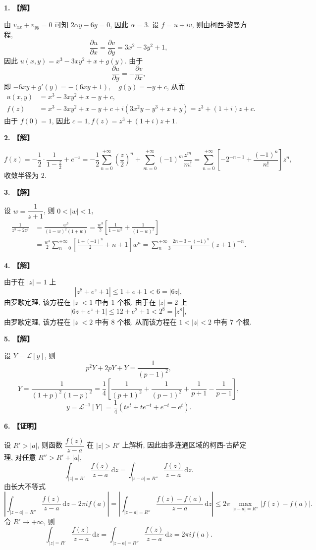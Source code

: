 \documentclass[simple]{hfutexam}
\newcommand{\diff}{\,\mathrm{d}}
\newcommand\msl{\mathscr{L}}
\begin{document}

\textbf{1. 【解】}

由 $v_{xx}+v_{yy}=0$ 可知 $2\alpha y-6y=0$, 因此 $\alpha=3$.
设 $f=u+iv$, 则由柯西-黎曼方程,
  \[\frac{\partial u}{\partial x}=\frac{\partial v}{\partial y}=3x^2-3y^2+1,\]
因此 $u(x,y)=x^3-3xy^2+x+g(y)$.
由于
  \[\frac{\partial u}{\partial y}=-\frac{\partial v}{\partial x},\]
即 $-6xy+g'(y)=-(6xy+1),\quad g(y)=-y+c$, 从而
\begin{align*}
u(x,y)&=x^3-3xy^2+x-y+c,\\
f(z)&=x^3-3xy^2+x-y+c+i(3x^2y-y^3+x+y)
  =z^3+(1+i)z+c.
\end{align*}
由于 $f(0)=1$, 因此 $c=1,f(z)=z^3+(1+i)z+1$.

\textbf{2. 【解】}

\[f(z)=-\frac{1}{2}\cdot\frac{1}{1-\frac z2}+e^{-z}
=-\frac{1}{2}\sum_{n=0}^{+\infty} \left(\frac{z}{2}\right)^n+\sum_{m=0}^{+\infty} (-1)^m\frac{z^m}{m!}
=\sum_{n=0}^{+\infty} \left[-2^{-n-1}+\frac{(-1)^n}{n!}\right]z^n,\]
收敛半径为 $2$.

\textbf{3. 【解】}

设 $w=\dfrac1{z+1}$, 则 $0<|w|<1$,
\begin{align*}
\frac{1}{z^3+2z^2}&=\frac{w^3}{(1-w)^2(1+w)}=\frac{w^3}{2}\left[\frac{1}{1-w^2}+\frac{1}{(1-w)^2}\right]\\
&=\frac{w^3}{2}\sum_{n=0}^{+\infty}\left[\frac{1+(-1)^n}{2}+n+1\right]w^n
=\sum_{n=3}^{+\infty}\frac{2n-3-(-1)^n}{4}(z+1)^{-n}.
\end{align*}

\textbf{4. 【解】}

由于在 $|z|=1$ 上
\[|z^8+e^z+1|\le 1+e+1<6=|6z|,\]
由罗歇定理, 该方程在 $|z|<1$ 中有 $1$ 个根. 由于在 $|z|=2$ 上
\[|6z+e^z+1|\le 12+e^2+1<2^8=|z^8|,\]
由罗歇定理, 该方程在 $|z|<2$ 中有 $8$ 个根.
从而该方程在 $1<|z|<2$ 中有 $7$ 个根.

\textbf{5. 【解】}

设 $Y=\msl[y]$, 则
\[p^2Y+2pY+Y=\frac{1}{(p-1)^2},\]
\[Y=\frac{1}{(1+p)^2(1-p)^2}=\frac{1}{4}\left[\frac{1}{(p+1)^2}+\frac{1}{(p-1)^2}+\frac{1}{p+1}-\frac{1}{p-1}\right],\]
\[y=\msl^{-1}[Y]=\frac{1}{4}(te^t+te^{-t}+e^{-t}-e^t).\]

\textbf{6. 【证明】}

设 $R'>|a|$, 则函数 $\dfrac{f(z)}{z-a}$ 在 $|z|>R'$ 上解析, 因此由多连通区域的柯西-古萨定理, 对任意 $R''>R'+|a|$,
  \[\int_{|z|=R'} \frac{f(z)}{z-a}\diff z=\int_{|z-a|=R''} \frac{f(z)}{z-a}\diff z.\]
由长大不等式
  \[\left|\int_{|z-a|=R''} \frac{f(z)}{z-a}\diff z-2\pi if(a)\right|
  =\left|\int_{|z-a|=R''} \frac{f(z)-f(a)}{z-a}\diff z\right|
  \le 2\pi \max_{|z-a|=R''}|f(z)-f(a)|.  \]
令 $R'\to+\infty$, 则 
  \[\int_{|z|=R'} \frac{f(z)}{z-a}\diff z=\int_{|z-a|=R''} \frac{f(z)}{z-a}\diff z=2\pi if(a).\]
\end{document}

